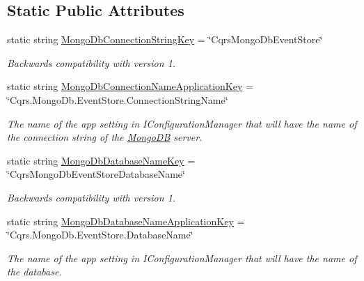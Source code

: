 \subsection*{Static Public Attributes}
\begin{DoxyCompactItemize}
\item 
static string \hyperlink{classCqrs_1_1MongoDB_1_1Events_1_1MongoDbEventStoreConnectionStringFactory_a0e1916a92e01f0b5cf15695478170d68_a0e1916a92e01f0b5cf15695478170d68}{Mongo\+Db\+Connection\+String\+Key} = \char`\"{}Cqrs\+Mongo\+Db\+Event\+Store\char`\"{}
\begin{DoxyCompactList}\small\item\em Backwards compatibility with version 1. \end{DoxyCompactList}\item 
static string \hyperlink{classCqrs_1_1MongoDB_1_1Events_1_1MongoDbEventStoreConnectionStringFactory_a90c864fa4298dc679abe4e264d17cf04_a90c864fa4298dc679abe4e264d17cf04}{Mongo\+Db\+Connection\+Name\+Application\+Key} = \char`\"{}Cqrs.\+Mongo\+Db.\+Event\+Store.\+Connection\+String\+Name\char`\"{}
\begin{DoxyCompactList}\small\item\em The name of the app setting in I\+Configuration\+Manager that will have the name of the connection string of the \hyperlink{namespaceCqrs_1_1MongoDB}{Mongo\+DB} server. \end{DoxyCompactList}\item 
static string \hyperlink{classCqrs_1_1MongoDB_1_1Events_1_1MongoDbEventStoreConnectionStringFactory_a5ea3576b77bf46894277b0bba8f5d2bb_a5ea3576b77bf46894277b0bba8f5d2bb}{Mongo\+Db\+Database\+Name\+Key} = \char`\"{}Cqrs\+Mongo\+Db\+Event\+Store\+Database\+Name\char`\"{}
\begin{DoxyCompactList}\small\item\em Backwards compatibility with version 1. \end{DoxyCompactList}\item 
static string \hyperlink{classCqrs_1_1MongoDB_1_1Events_1_1MongoDbEventStoreConnectionStringFactory_afcf5a4f8e445742625b9ca45bc455247_afcf5a4f8e445742625b9ca45bc455247}{Mongo\+Db\+Database\+Name\+Application\+Key} = \char`\"{}Cqrs.\+Mongo\+Db.\+Event\+Store.\+Database\+Name\char`\"{}
\begin{DoxyCompactList}\small\item\em The name of the app setting in I\+Configuration\+Manager that will have the name of the database. \end{DoxyCompactList}\end{DoxyCompactItemize}

